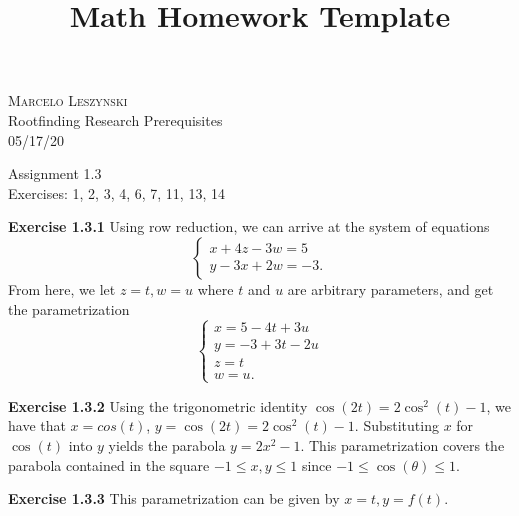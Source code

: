 \documentclass[12pt,oneside]{article}
\newenvironment{exercise}[1]{\vspace{.1in}\noindent\textbf{Exercise #1 \hspace{.05em}}}{}
\begin{document}
\title{Math Homework Template}

\begin{flushright}
\textsc{Marcelo Leszynski}  \\
Rootfinding Research Prerequisites\\
05/17/20
\end{flushright}

\begin{center}
\textsf{Assignment 1.3 } \\
\textsf{Exercises: 1, 2, 3, 4, 6, 7, 11, 13, 14 }
\end{center}


\begin{exercise}{1.3.1}
    Using row reduction, we can arrive at the system of equations
    \[
        \begin{cases}
            x + 4z -3w = 5\\
            y - 3x + 2w = -3.
        \end{cases}
    \]
    From here, we let $z = t, w = u$ where $t$ and $u$ are arbitrary parameters, and 
    get the parametrization 
    \[
        \begin{cases}
            x = 5 - 4t + 3u\\
            y = -3 + 3t - 2u\\
            z = t\\
            w = u.
        \end{cases}
    \]
\end{exercise}


\begin{exercise}{1.3.2}
    Using the trigonometric identity $\cos(2t) = 2\cos^2(t) - 1$, we have that 
    $x = cos(t)$, $y = \cos(2t) = 2\cos^2(t) - 1$. Substituting $x$ for $\cos(t)$ into $y$
    yields the parabola $y=2x^2-1$. This parametrization covers the parabola contained 
    in the square $-1 \leq x, y \leq 1$ since $-1 \leq \cos(\theta) \leq 1$.
\end{exercise}


\begin{exercise}{1.3.3}
    This parametrization can be given by $x = t, y = f(t)$.
\end{exercise}
\end{document}
